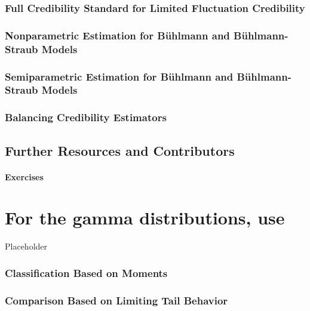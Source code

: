 \documentclass[]{book}
\theoremstyle{definition}
\theoremstyle{definition}
\theoremstyle{definition}
\theoremstyle{remark}
\begin{document}
\subsection{Full Credibility Standard for Limited Fluctuation
Credibility}\label{full-credibility-standard-for-limited-fluctuation-credibility}

\subsection{Nonparametric Estimation for Bühlmann and Bühlmann-Straub
Models}\label{nonparametric-estimation-for-buhlmann-and-buhlmann-straub-models}

\subsection{Semiparametric Estimation for Bühlmann and Bühlmann-Straub
Models}\label{semiparametric-estimation-for-buhlmann-and-buhlmann-straub-models}

\subsection{Balancing Credibility
Estimators}\label{balancing-credibility-estimators}

\section{Further Resources and
Contributors}\label{Cred-further-reading-and-resources}

\subsubsection*{Exercises}\label{exercises-3}

\chapter{For the gamma distributions,
use}\label{for-the-gamma-distributions-use}

Placeholder

\subsection{Classification Based on
Moments}\label{classification-based-on-moments}

\subsection{Comparison Based on Limiting Tail
Behavior}\label{comparison-based-on-limiting-tail-behavior}
\end{document}
